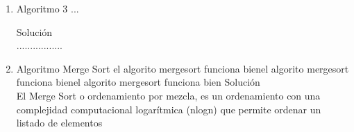 \documentclass{article}
\begin{document}
\begin{enumerate}
        \item Algoritmo 3 ...
		
		Solución \\
		.................
		
	    \item Algoritmo Merge Sort
		el algorito mergesort funciona bienel algorito mergesort funciona bienel algorito mergesort funciona bien
		Solución \\
		
		El Merge Sort o ordenamiento por mezcla, es un ordenamiento con una complejidad computacional logarítmica (nlogn) que permite ordenar un listado de elementos

		
	\end{enumerate}



	
		
	
\end{document}
